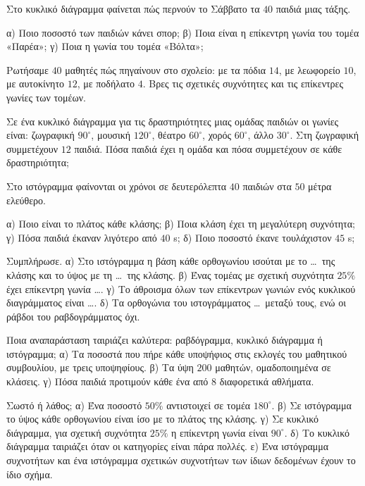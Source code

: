 

\ex Στο κυκλικό διάγραμμα φαίνεται πώς περνούν το Σάββατο τα $40$ παιδιά μιας τάξης.
\begin{center}
\end{center}
α) Ποιο ποσοστό των παιδιών κάνει σπορ; β) Ποια είναι η επίκεντρη γωνία του τομέα «Παρέα»; γ) Ποια η γωνία του τομέα «Βόλτα»;

\ex Ρωτήσαμε $40$ μαθητές πώς πηγαίνουν στο σχολείο: με τα πόδια $14$, με λεωφορείο $10$, με αυτοκίνητο $12$, με ποδήλατο $4$. Βρες τις σχετικές συχνότητες και τις επίκεντρες γωνίες των τομέων.

\ex Σε ένα κυκλικό διάγραμμα για τις δραστηριότητες μιας ομάδας παιδιών οι γωνίες είναι: ζωγραφική $90^\circ$, μουσική $120^\circ$, θέατρο $60^\circ$, χορός $60^\circ$, άλλο $30^\circ$. Στη ζωγραφική συμμετέχουν $12$ παιδιά. Πόσα παιδιά έχει η ομάδα και πόσα συμμετέχουν σε κάθε δραστηριότητα;

\ex Στο ιστόγραμμα φαίνονται οι χρόνοι σε δευτερόλεπτα $40$ παιδιών στα $50$ μέτρα ελεύθερο.
\begin{center}
\end{center}
α) Ποιο είναι το πλάτος κάθε κλάσης; β) Ποια κλάση έχει τη μεγαλύτερη συχνότητα; γ) Πόσα παιδιά έκαναν λιγότερο από $40$ s; δ) Ποιο ποσοστό έκανε τουλάχιστον $45$ s;

\ex Συμπλήρωσε. α) Στο ιστόγραμμα η βάση κάθε ορθογωνίου ισούται με το \ldots\ της κλάσης και το ύψος με τη \ldots\ της κλάσης. β) Ένας τομέας με σχετική συχνότητα $25\%$ έχει επίκεντρη γωνία \ldots. γ) Το άθροισμα όλων των επίκεντρων γωνιών ενός κυκλικού διαγράμματος είναι \ldots. δ) Τα ορθογώνια του ιστογράμματος \ldots\ μεταξύ τους, ενώ οι ράβδοι του ραβδογράμματος όχι.

\ex Ποια αναπαράσταση ταιριάζει καλύτερα: ραβδόγραμμα, κυκλικό διάγραμμα ή ιστόγραμμα; α) Τα ποσοστά που πήρε κάθε υποψήφιος στις εκλογές του μαθητικού συμβουλίου, με τρεις υποψηφίους. β) Τα ύψη $200$ μαθητών, ομαδοποιημένα σε κλάσεις. γ) Πόσα παιδιά προτιμούν κάθε ένα από $8$ διαφορετικά αθλήματα.

\ex Σωστό ή λάθος; α) Ένα ποσοστό $50\%$ αντιστοιχεί σε τομέα $180^\circ$. β) Σε ιστόγραμμα το ύψος κάθε ορθογωνίου είναι ίσο με το πλάτος της κλάσης. γ) Σε κυκλικό διάγραμμα, για σχετική συχνότητα $25\%$ η επίκεντρη γωνία είναι $90^\circ$. δ) Το κυκλικό διάγραμμα ταιριάζει όταν οι κατηγορίες είναι πάρα πολλές. ε) Ένα ιστόγραμμα συχνοτήτων και ένα ιστόγραμμα σχετικών συχνοτήτων των ίδιων δεδομένων έχουν το ίδιο σχήμα.

